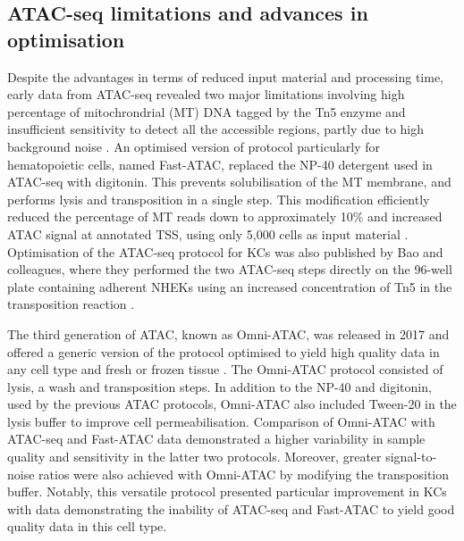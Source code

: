 \subsection{ATAC-seq limitations and advances in optimisation}  
Despite the advantages in terms of reduced input material and processing time, early data from ATAC-seq revealed two major limitations involving high percentage of mitochrondrial (MT) DNA tagged by the Tn5 enzyme and insufficient sensitivity to detect all the accessible regions, partly due to high background noise \parencite{Corces2016, Sos2016}. An optimised version of protocol particularly for hematopoietic cells, named Fast-ATAC, replaced the NP-40 detergent used in ATAC-seq with digitonin. This prevents solubilisation of the MT membrane, and performs lysis and transposition in a single step. This modification efficiently reduced the percentage of MT reads down to approximately 10\% and increased ATAC signal at annotated TSS, using only 5,000 cells as input material \parencite{Corces2016}. Optimisation of the ATAC-seq protocol for KCs was also published by Bao and colleagues, where they performed the two ATAC-seq steps directly on the 96-well plate containing adherent NHEKs using an increased concentration of Tn5 in the transposition reaction \parencite{Bao2015}.


The third generation of ATAC, known as Omni-ATAC, was released in 2017 and offered a generic version of the protocol optimised to yield high quality data in any cell type and fresh or frozen tissue \parencite{Corces2017}. The Omni-ATAC protocol consisted of lysis, a wash and transposition steps. In addition to the NP-40 and digitonin, used by the previous ATAC protocols, Omni-ATAC also included Tween-20 in the lysis buffer to improve cell permeabilisation. Comparison of Omni-ATAC with ATAC-seq and Fast-ATAC data demonstrated a higher variability in sample quality and sensitivity in the latter two protocols. Moreover, greater signal-to-noise ratios were also achieved with Omni-ATAC by modifying the transposition buffer. Notably, this versatile protocol presented particular improvement in KCs with data demonstrating the inability of ATAC-seq and Fast-ATAC to yield good quality data in this cell type.  



